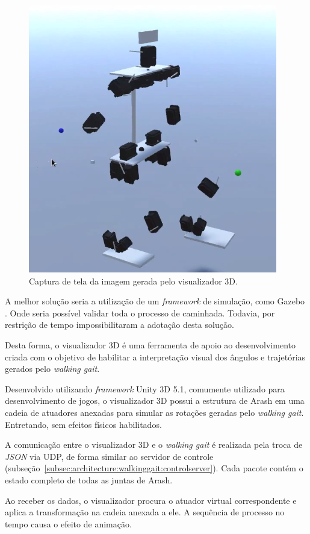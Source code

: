 \begin{figure}[htb]
	\centering
	\includegraphics[scale=0.55]{imagens/visualizador3d}
	\caption{Captura de tela da imagem gerada pelo visualizador 3D.}
	\label{fig:architecture:visualization:printscreen}
\end{figure}

A melhor solução seria a utilização de um \textit{framework} de simulação, como Gazebo \cite{gazebo}. Onde seria possível validar toda o processo de caminhada. Todavia, por restrição de tempo impossibilitaram a adotação desta solução. 

Desta forma, o visualizador 3D é uma ferramenta de apoio ao desenvolvimento criada com o objetivo de habilitar a interpretação visual dos ângulos e trajetórias gerados pelo \textit{walking gait}.

Desenvolvido utilizando \textit{framework} Unity 3D 5.1, comumente utilizado para desenvolvimento de jogos, o visualizador 3D possui a estrutura de Arash em uma cadeia de atuadores anexadas para simular as rotações geradas pelo \textit{walking gait}. Entretando, sem efeitos físicos habilitados.

A comunicação entre o visualizador 3D e o \textit{walking gait} é realizada pela troca de \textit{JSON} via UDP, de forma similar ao servidor de controle (subseção~\ref{subsec:architecture:walkinggait:controlserver}). Cada pacote contém o estado completo de todas as juntas de Arash.

Ao receber os dados, o visualizador procura o atuador virtual correspondente e aplica a transformação na cadeia anexada a ele. A sequência de processo no tempo causa o efeito de animação.